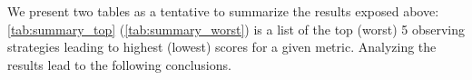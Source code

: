We present two tables as a tentative to summarize the results exposed above: \ref{tab:summary_top} (\ref{tab:summary_worst}) is a list of the top (worst) 5 observing strategies leading to highest (lowest) scores for a given metric. Analyzing the results lead to the following conclusions.

\begin{comment}
\paragraph{Primary metric} Among the set of metrics considered in this paper one of the most sensitive to the features of observing strategies (ie the key facets discussed many times above: cadence, season length, depth, spatial coverage and uniformity) is probably the number of well-measured \sne. In fact all other metrics (except the one related to synergy with 4MOST) rely on a high-quality\sne sample. The w0-wa Figure of Merit is usually used to assess the quality of observing strategies because it can easily be compared and/or combined with other Dark Energy probes. But this metric seems to have  a limited sensivity (see Figure \ref{sn:fom} where most of the cadences have a DETF between 450 and 500) and is in any case optimistic (to a degree difficult to estimate). pontus\_2502 vs pontus\_2002 ? We thus think that the primary metric to assess the quality of observing strategies should be the number of well-measured supernovae.

\paragraph{WFD observing strategy}


\paragraph{DDF observing strategy}

\end{comment}

